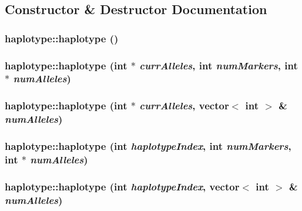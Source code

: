 \subsection{Constructor \& Destructor Documentation}
\hypertarget{classhaplotype_a5694859723a1ebc9a59a14d751a5a567}{
\subsubsection[{haplotype}]{\setlength{\rightskip}{0pt plus 5cm}haplotype::haplotype ()}}
\label{classhaplotype_a5694859723a1ebc9a59a14d751a5a567}
\hypertarget{classhaplotype_a63fed0a74374b6ff6737d50ef86b108e}{
\subsubsection[{haplotype}]{\setlength{\rightskip}{0pt plus 5cm}haplotype::haplotype (int $\ast$ {\em currAlleles}, \/  int {\em numMarkers}, \/  int $\ast$ {\em numAlleles})}}
\label{classhaplotype_a63fed0a74374b6ff6737d50ef86b108e}
\hypertarget{classhaplotype_a0a832821c6cfda47917099f2ed923dae}{
\subsubsection[{haplotype}]{\setlength{\rightskip}{0pt plus 5cm}haplotype::haplotype (int $\ast$ {\em currAlleles}, \/  vector$<$ int $>$ \& {\em numAlleles})}}
\label{classhaplotype_a0a832821c6cfda47917099f2ed923dae}
\hypertarget{classhaplotype_ac1f66d31cafa6ad79b293fb54268249e}{
\subsubsection[{haplotype}]{\setlength{\rightskip}{0pt plus 5cm}haplotype::haplotype (int {\em haplotypeIndex}, \/  int {\em numMarkers}, \/  int $\ast$ {\em numAlleles})}}
\label{classhaplotype_ac1f66d31cafa6ad79b293fb54268249e}
\hypertarget{classhaplotype_aff032acba0888901b10d61fc4652fbb4}{
\subsubsection[{haplotype}]{\setlength{\rightskip}{0pt plus 5cm}haplotype::haplotype (int {\em haplotypeIndex}, \/  vector$<$ int $>$ \& {\em numAlleles})}}
